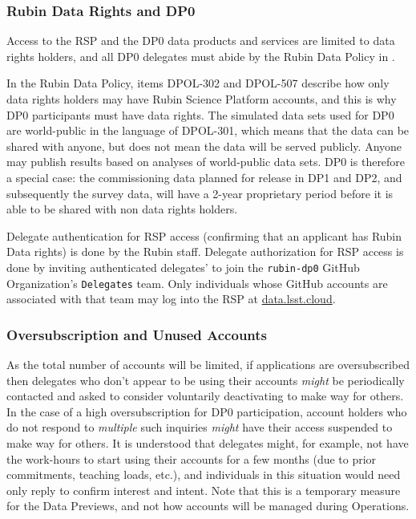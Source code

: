 \documentclass[DM,lsstdraft,authoryear,toc]{lsstdoc}
\begin{document}
\subsubsection{Rubin Data Rights and DP0}

Access to the RSP and the DP0 data products and services are limited to data rights holders, and all DP0 delegates must abide by the Rubin Data Policy in .

In the Rubin Data Policy, items DPOL-302 and DPOL-507 describe how only data rights holders may have Rubin Science Platform accounts, and this is why DP0 participants must have data rights.
The simulated data sets used for DP0 are world-public in the language of DPOL-301, which means that the data can be shared with anyone, but does not mean the data will be served publicly.
Anyone may publish results based on analyses of world-public data sets.
DP0 is therefore a special case: the commissioning data planned for release in DP1 and DP2, and subsequently the survey data, will have a 2-year proprietary period before it is able to be shared with non data rights holders.

Delegate authentication for RSP access (confirming that an applicant has Rubin Data rights) is done by the Rubin staff.
Delegate authorization for RSP access is done by inviting authenticated delegates' to join the {\tt rubin-dp0} GitHub Organization's {\tt Delegates} team. 
Only individuals whose GitHub accounts are associated with that team may log into the RSP at \url{data.lsst.cloud}. 


\subsubsection{Oversubscription and Unused Accounts}

As the total number of accounts will be limited, if applications are oversubscribed then delegates who don't appear to be using their accounts {\it might} be periodically contacted and asked to consider voluntarily deactivating to make way for others.
In the case of a high oversubscription for DP0 participation, account holders who do not respond to \emph{multiple} such inquiries \emph{might} have their access suspended to make way for others.
It is understood that delegates might, for example, not have the work-hours to start using their accounts for a few months (due to prior commitments, teaching loads, etc.), and individuals in this situation would need only reply to confirm interest and intent. 
Note that this is a temporary measure for the Data Previews, and not how accounts will be managed during Operations.
\end{document}
